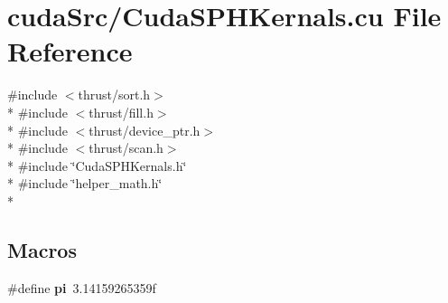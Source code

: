 \hypertarget{_cuda_s_p_h_kernals_8cu}{\section{cuda\-Src/\-Cuda\-S\-P\-H\-Kernals.cu File Reference}
\label{_cuda_s_p_h_kernals_8cu}
}
{\ttfamily \#include $<$thrust/sort.\-h$>$}\\*
{\ttfamily \#include $<$thrust/fill.\-h$>$}\\*
{\ttfamily \#include $<$thrust/device\-\_\-ptr.\-h$>$}\\*
{\ttfamily \#include $<$thrust/scan.\-h$>$}\\*
{\ttfamily \#include \char`\"{}Cuda\-S\-P\-H\-Kernals.\-h\char`\"{}}\\*
{\ttfamily \#include \char`\"{}helper\-\_\-math.\-h\char`\"{}}\\*
\subsection*{Macros}
\begin{DoxyCompactItemize}
\item 
\hypertarget{_cuda_s_p_h_kernals_8cu_a1daf785e3f68d293c7caa1c756d5cb74}{\#define {\bfseries pi}~3.\-14159265359f}\label{_cuda_s_p_h_kernals_8cu_a1daf785e3f68d293c7caa1c756d5cb74}

\end{DoxyCompactItemize}
